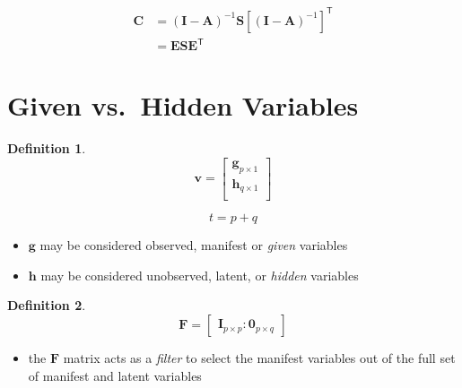 \documentclass[
]{book}
\providecommand{\tightlist}{%
  \setlength{\itemsep}{0pt}\setlength{\parskip}{0pt}}
\theoremstyle{definition}
\newtheorem{definition}{Definition}[chapter]
\theoremstyle{definition}
\theoremstyle{definition}
\theoremstyle{remark}
\begin{document}
\begin{equation}
  \begin{split}
    \mathbf{C}
    &=
    \left( \mathbf{I} - \mathbf{A} \right)^{-1}
    \mathbf{S}
    \left[ \left( \mathbf{I} - \mathbf{A} \right)^{-1} \right]^{\mathsf{T}} \\
    &=
    \mathbf{E} \mathbf{S} \mathbf{E}^{\mathsf{T}}
  \end{split}
\end{equation}

\hypertarget{given-vs.-hidden-variables}{%
\section{Given vs.~Hidden Variables}\label{given-vs.-hidden-variables}}

\begin{definition}
\protect\hypertarget{def:unnamed-chunk-6}{}{\label{def:unnamed-chunk-6} }\begin{equation}
  \mathbf{v}
  =
  \begin{bmatrix}
    \mathbf{g}_{p \times 1} \\
    \mathbf{h}_{q \times 1} \\
  \end{bmatrix}
\end{equation}

\begin{equation}
  t = p + q
\end{equation}
\end{definition}

\begin{itemize}
\tightlist
\item
  \(\mathbf{g}\) may be considered observed, manifest or \emph{given} variables
\item
  \(\mathbf{h}\) may be considered unobserved, latent, or \emph{hidden} variables
\end{itemize}

\begin{definition}
\protect\hypertarget{def:unnamed-chunk-7}{}{\label{def:unnamed-chunk-7} }\begin{equation}
  \mathbf{F}
  =
  \begin{bmatrix}
    \mathbf{I}_{p \times p} : \mathbf{0}_{p \times q}
  \end{bmatrix}
\end{equation}
\end{definition}

\begin{itemize}
\tightlist
\item
  the \(\mathbf{F}\) matrix acts as a \emph{filter} to select the manifest variables
  out of the full set of manifest and latent variables
\end{itemize}
\end{document}

